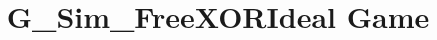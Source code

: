 \documentclass[a3paper]{article}
\title{G_Sim_FreeXORIdeal Game}
\theoremstyle{definition}
\begin{document}
\maketitle
\begin{center}

\end{center}
\begin{pchstack}

\pchspace
\end{pchstack}
\end{document}
